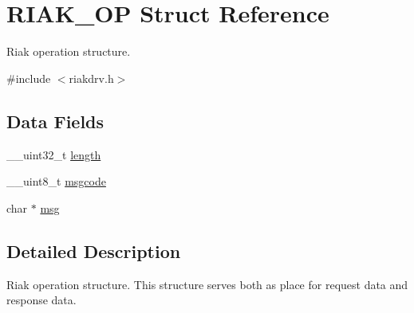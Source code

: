 \hypertarget{structRIAK__OP}{
\section{RIAK\_\-OP Struct Reference}
\label{structRIAK__OP}
}


Riak operation structure.  




{\ttfamily \#include $<$riakdrv.h$>$}

\subsection*{Data Fields}
\begin{DoxyCompactItemize}
\item 
\_\-\_\-uint32\_\-t \hyperlink{structRIAK__OP_ad9a9ebef38f4c35c0cb13f331bb817b8}{length}
\item 
\_\-\_\-uint8\_\-t \hyperlink{structRIAK__OP_abde5e88f658ba818a8b083d8927fc59f}{msgcode}
\item 
char $\ast$ \hyperlink{structRIAK__OP_ab3584d73e5c9a8486ee78b239a35d151}{msg}
\end{DoxyCompactItemize}


\subsection{Detailed Description}
Riak operation structure. This structure serves both as place for request data and response data. 

